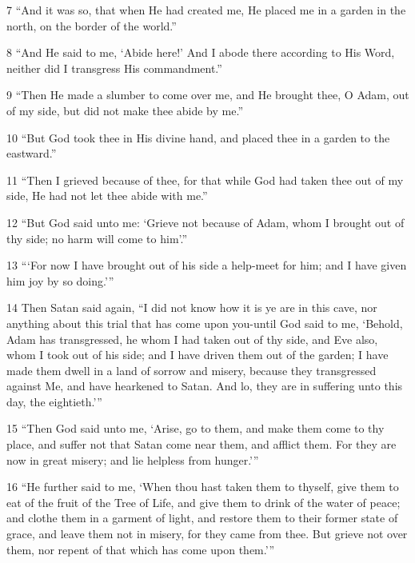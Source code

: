 \par 7 “And it was so, that when He had created me, He placed me in a garden in the north, on the border of the world.”

\par 8 “And He said to me, ‘Abide here!’ And I abode there according to His Word, neither did I transgress His commandment.”

\par 9 “Then He made a slumber to come over me, and He brought thee, O Adam, out of my side, but did not make thee abide by me.”

\par 10 “But God took thee in His divine hand, and placed thee in a garden to the eastward.”

\par 11 “Then I grieved because of thee, for that while God had taken thee out of my side, He had not let thee abide with me.”

\par 12 “But God said unto me: ‘Grieve not because of Adam, whom I brought out of thy side; no harm will come to him’.”

\par 13 “‘For now I have brought out of his side a help-meet for him; and I have given him joy by so doing.’”

\par 14 Then Satan said again, “I did not know how it is ye are in this cave, nor anything about this trial that has come upon you-until God said to me, ‘Behold, Adam has transgressed, he whom I had taken out of thy side, and Eve also, whom I took out of his side; and I have driven them out of the garden; I have made them dwell in a land of sorrow and misery, because they transgressed against Me, and have hearkened to Satan. And lo, they are in suffering unto this day, the eightieth.’”

\par 15 “Then God said unto me, ‘Arise, go to them, and make them come to thy place, and suffer not that Satan come near them, and afflict them. For they are now in great misery; and lie helpless from hunger.’”

\par 16 “He further said to me, ‘When thou hast taken them to thyself, give them to eat of the fruit of the Tree of Life, and give them to drink of the water of peace; and clothe them in a garment of light, and restore them to their former state of grace, and leave them not in misery, for they came from thee. But grieve not over them, nor repent of that which has come upon them.’”


